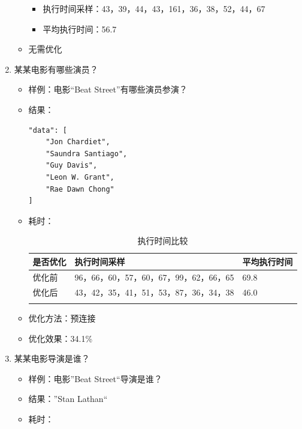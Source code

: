 \documentclass{ctexrep}
\begin{document}
\begin{enumerate}
\begin{itemize}
    	                \begin{itemize}
    	                    \item 执行时间采样：43，39，44，43，161，36，38，52，44，67
    	                    \item 平均执行时间：56.7
    	                \end{itemize}
    	            \item 无需优化
    	        \end{itemize}
	        \item 某某电影有哪些演员？
    	        \begin{itemize}
    	            \item 样例：电影“Beat Street”有哪些演员参演？
    	            \item 结果：
    	                \begin{lstlisting}
"data": [
    "Jon Chardiet",
    "Saundra Santiago",
    "Guy Davis",
    "Leon W. Grant",
    "Rae Dawn Chong"
]
    	                \end{lstlisting}
    	            \item 耗时：
    	                \begin{longtable}{l|p{5cm}|l}
    	                    \hline
    	                    是否优化 & 执行时间采样 & 平均执行时间\\
    	                    \hline
    	                    \hline
    	                    优化前 & 96，66，60，57，60，67，99，62，66，65 & 69.8\\
    	                    优化后 & 43，42，35，41，51，53，87，36，34，38 & 46.0\\
    	                    \hline
    	                    \caption{执行时间比较}
    	                \end{longtable}
    	            \item 优化方法：预连接
    	            \item 优化效果：34.1\%
    	        \end{itemize}
	        \item 某某电影导演是谁？
    	        \begin{itemize}
    	            \item 样例：电影”Beat Street“导演是谁？
    	            \item 结果：”Stan Lathan“
    	            \item 耗时：
    	                \begin{longtable}{l|p{5cm}|l}
    	                    \hline

\end{longtable}
\end{itemize}
\end{enumerate}
\end{document}

